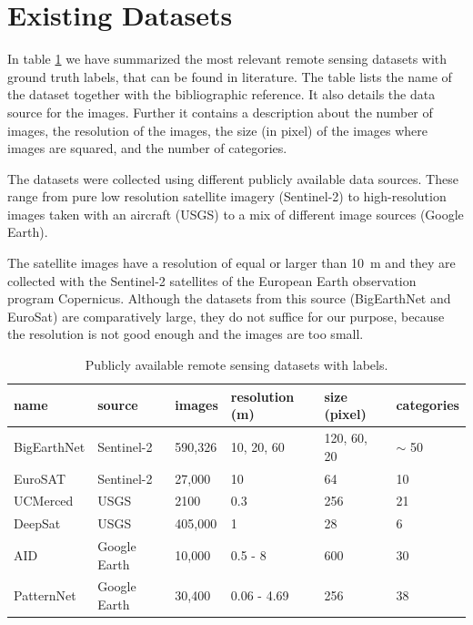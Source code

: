 \section{Existing Datasets}

In table \ref{table:datasets} we have summarized the most relevant remote sensing datasets with ground truth labels, that can be found in literature. The table  lists the name of the dataset together with the bibliographic reference. It also details the data source for the images. Further it contains a description about the number of images, the resolution of the images, the size (in pixel) of the images where images are squared, and the number of categories.

The datasets were collected using different publicly available data sources. These range from pure low resolution satellite imagery (Sentinel-2) to high-resolution images taken with an aircraft (USGS) to a mix of different image sources (Google Earth). 

The satellite images have a resolution of equal or larger than 10~m and they are collected with the Sentinel-2 satellites of the European Earth observation program Copernicus. Although the datasets from this source (BigEarthNet and EuroSat) are comparatively large, they do not suffice for our purpose, because the resolution is not good enough and the images are too small.

\begin{table}[h!]
	\begin{tabular}{l | l | l | l | l | l }
	name & source & images & resolution (m) & size (pixel) & categories \\
	\hline
	BigEarthNet \parencite{sumbul2019} & Sentinel-2 & 590,326 & 10, 20, 60 & 120, 60, 20 & $\sim$ 50 \\
	EuroSAT \parencite{helber2017}	& Sentinel-2 & 27,000  & 10 & 64  & 10 \\
	UCMerced \parencite{yang2010} & USGS & 2100 & 0.3 & 256 & 21 \\
	DeepSat \parencite{basu2015}  & USGS  & 405,000 & 1 & 28 & 6  \\
	AID \parencite{xia2016} & Google Earth & 10,000  & 0.5 - 8  & 600 & 30 \\
	PatternNet \parencite{zhou2017} & Google Earth & 30,400 & 0.06 - 4.69 & 256 & 38 \\
	\end{tabular}
	\caption{Publicly available remote sensing datasets with labels.}
	\label{table:datasets}	
\end{table}

